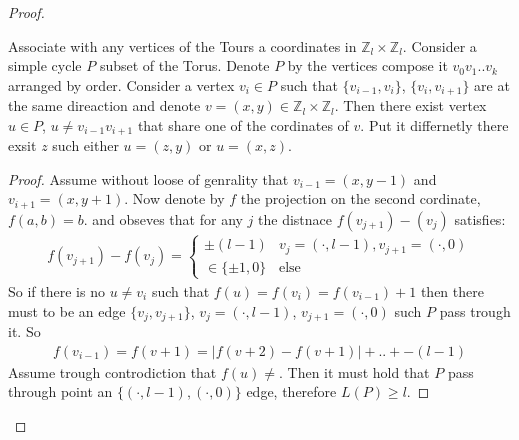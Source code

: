 \begin{proof}
  \begin{claim}
    Associate with any vertices of the Tours a coordinates in $\mathbb{Z}_{l} \times \mathbb{Z}_{l}$. Consider a simple cycle $P$ subset of the Torus. Denote $P$ by the vertices compose it $v_{0}v_{1}..v_{k}$ arranged by order. Consider a  vertex $v_{i} \in P$ such that $\{v_{i-1}, v_{i}\}$, $\{v_{i}, v_{i+1}\}$ are at the same direaction and denote $v = \left( x,y \right) \in $$ \mathbb{Z}_{l} \times \mathbb{Z}_{l}$. Then there exist vertex $u \in P$, $ u \neq v_{i-1}v_{i+1}$ that share one of the cordinates of $v$. Put it differnetly there exsit $z$ such either  $u = \left( z,y \right)$ or $u = \left( x,z \right)$. 
  \end{claim}

  \begin{proof}
  Assume without loose of genrality that $v_{i-1} = \left( x, y -1 \right)$ and $v_{i+1} =\left( x,y+1 \right)$. Now denote by $f$ the projection on the second cordinate, $f(a,b)= b$. and obseves that for any $j$ the distnace $f\left( v_{j+1}\right) - \left( v_{j}  \right)$ satisfies:
    \begin{equation*}
      \begin{split}
      f\left( v_{j+1}\right) - f \left( v_{j}  \right) = 
        \begin{cases}
          \pm \left( l - 1 \right)  & v_{j} = \left( \cdot, l -1 \right), v_{j+1} = \left( \cdot, 0  \right)  \\
          \in \{ \pm 1 , 0\} & \text{else}
        \end{cases}
      \end{split}
    \end{equation*}
    So if there is no $u \neq v_{i}$ such that $f(u) = f(v_{i}) = f(v_{i-1})+1$ then there must to be an edge $\{v_{j},v_{j+1}\}$, $v_{j} = \left( \cdot, l -1 \right)$, $ v_{j+1} = \left( \cdot, 0  \right)$ such $P$ pass trough it. So  
    \begin{equation*}
      \begin{split}
        f\left( v_{i-1} \right) = f\left( v+1 \right) = |f\left( v+2 \right) -  f\left( v+1 \right)| + .. + -\left( l - 1 \right)
      \end{split}
    \end{equation*}
    Assume trough controdiction that $f(u) \neq  $. Then it must hold that $P$ pass through point an $\{(\cdot, l-1), (\cdot, 0)\}$ edge, therefore $L\left(P\right) \ge l$. 
  \end{proof}


\end{proof}
